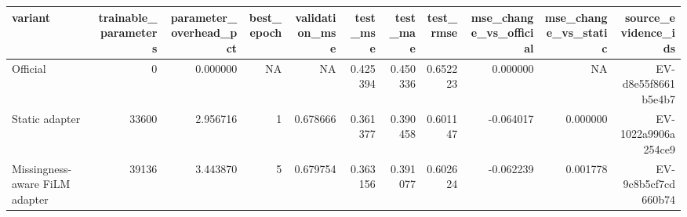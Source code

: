 \begin{tabular}{lrrrrrrrrrr}
\hline
variant & trainable\_parameters & parameter\_overhead\_pct & best\_epoch & validation\_mse & test\_mse & test\_mae & test\_rmse & mse\_change\_vs\_official & mse\_change\_vs\_static & source\_evidence\_ids \\
\hline
Official & 0 & 0.000000 & NA & NA & 0.425394 & 0.450336 & 0.652223 & 0.000000 & NA & EV-d8e55f8661b5e4b7 \\
Static adapter & 33600 & 2.956716 & 1 & 0.678666 & 0.361377 & 0.390458 & 0.601147 & -0.064017 & 0.000000 & EV-1022a9906a254ce9 \\
Missingness-aware FiLM adapter & 39136 & 3.443870 & 5 & 0.679754 & 0.363156 & 0.391077 & 0.602624 & -0.062239 & 0.001778 & EV-9c8b5cf7cd660b74 \\
\hline
\end{tabular}
